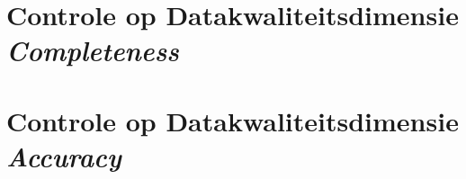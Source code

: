 \documentclass{report}
\begin{document}
    

    \section{Controle op Datakwaliteitsdimensie \textit{Completeness}}\label{section:checks_com}

    

    \section{Controle op Datakwaliteitsdimensie \textit{Accuracy}}\label{section:checks_acc}

    
\end{document}
